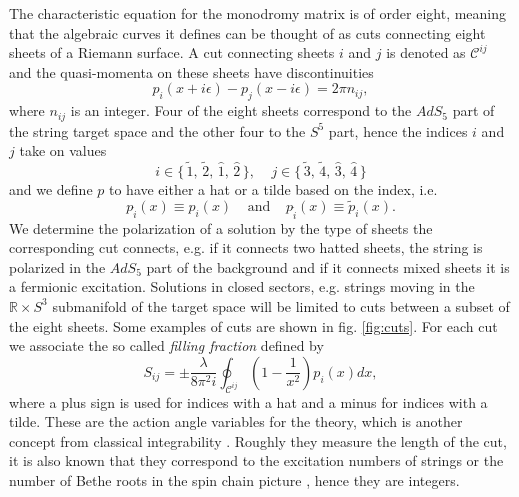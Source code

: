 The characteristic equation for the monodromy matrix is of order eight, meaning that the algebraic curves it defines can be thought of as cuts connecting eight sheets of a Riemann surface. A cut connecting sheets $i$ and $j$ is denoted as $\mathcal{C}^{ij}$ and the quasi-momenta on these sheets have discontinuities
\begin{equation}
	p_i(x + i\epsilon) - p_j(x - i\epsilon) = 2 \pi n_{ij},
	\label{eq:cut_condition}
\end{equation}  
where $n_{ij}$ is an integer. Four of the eight sheets correspond to the $AdS_5$ part of the string target space and the other four to the $S^5$ part, hence the indices $i$ and $j$ take on values
\begin{equation}
	i \in \{ \, \tilde{1}, \, \tilde{2}, \, \hat{1}, \, \hat{2} \, \}, \;\;\;\; j \in \{ \, \tilde{3}, \, \tilde{4}, \, \hat{3}, \, \hat{4} \, \}
\end{equation}
and we define $p$ to have either a hat or a tilde based on the index, i.e. 
\begin{equation}
	p_{\hat{i}} (x) \equiv \hat{p}_i (x) \;\;\;\; \mathrm{and} \;\;\;\; p_{\tilde{i}} (x) \equiv \tilde{p}_i (x).
\end{equation}
We determine the polarization of a solution by the type of sheets the corresponding cut connects, e.g. if it connects two hatted sheets, the string is polarized in the $AdS_5$ part of the background and if it connects mixed sheets it is a fermionic excitation. Solutions in closed sectors, e.g. strings moving in the $\mathbb{R} \times S^3$ submanifold of the target space will be limited to cuts between a subset of the eight sheets. Some examples of cuts are shown in fig. \ref{fig:cuts}. For each cut we associate the so called \emph{filling fraction} defined by
\begin{equation}
	S_{ij} = \pm \frac{\lambda}{8 \pi^2 i} \oint_{\mathcal{C}^{ij}} \left( 1 - \frac{1}{x^2} \right) p_i(x) dx,
\end{equation}
where a plus sign is used for indices with a hat and a minus for indices with a tilde. These are the action angle variables for the theory, which is another concept from classical integrability \cite{action_variables}. Roughly they measure the length of the cut, it is also known that they correspond to the excitation numbers of strings or the number of Bethe roots in the spin chain picture \cite{action_variables2}, hence they are integers. 


